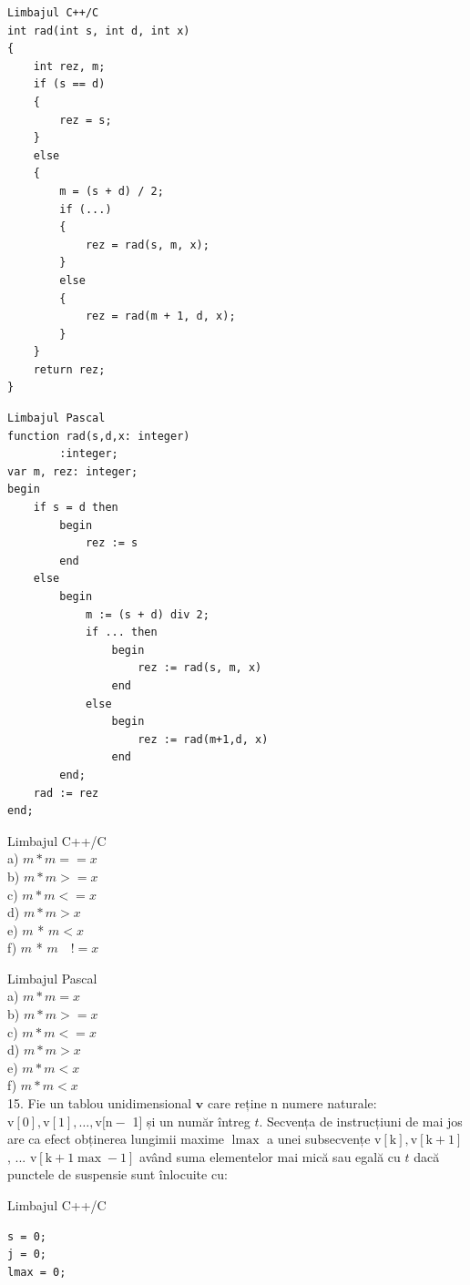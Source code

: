 \documentclass[10pt]{article}
\begin{document}
\begin{verbatim}
Limbajul C++/C
int rad(int s, int d, int x)
{
    int rez, m;
    if (s == d)
    {
        rez = s;
    }
    else
    {
        m = (s + d) / 2;
        if (...)
        {
            rez = rad(s, m, x);
        }
        else
        {
            rez = rad(m + 1, d, x);
        }
    }
    return rez;
}
\end{verbatim}

\begin{verbatim}
Limbajul Pascal
function rad(s,d,x: integer)
        :integer;
var m, rez: integer;
begin
    if s = d then
        begin
            rez := s
        end
    else
        begin
            m := (s + d) div 2;
            if ... then
                begin
                    rez := rad(s, m, x)
                end
            else
                begin
                    rez := rad(m+1,d, x)
                end
        end;
    rad := rez
end;
\end{verbatim}

Limbajul C++/C\\
a) $m * m==x$\\
b) $m * m>=x$\\
c) $m * m<=x$\\
d) $m * m>x$\\
e) $m$ * $m<x$\\
f) $m$ * $m \quad!=x$

Limbajul Pascal\\
a) $m * m=x$\\
b) $m * m>=x$\\
c) $m * m<=x$\\
d) $m * m>x$\\
e) $m * m<x$\\
f) $m * m<x$\\
15. Fie un tablou unidimensional $\mathbf{v}$ care reține n numere naturale: $\mathrm{v}[\mathrm{0}], \mathrm{v}[1], \ldots, \mathrm{v}[\mathrm{n}-$ 1] și un număr întreg $t$. Secvența de instrucțiuni de mai jos are ca efect obținerea lungimii maxime $\operatorname{lmax}$ a unei subsecvențe $\mathrm{v}[\mathrm{k}], \mathrm{v}[\mathrm{k}+1]$, ... $\mathrm{v}[\mathrm{k}+1 \max -1]$ având suma elementelor mai mică sau egală cu $t$ dacă punctele de suspensie sunt înlocuite cu:

Limbajul C++/C

\begin{verbatim}
s = 0;
j = 0;
lmax = 0;
\end{verbatim}
\end{document}
